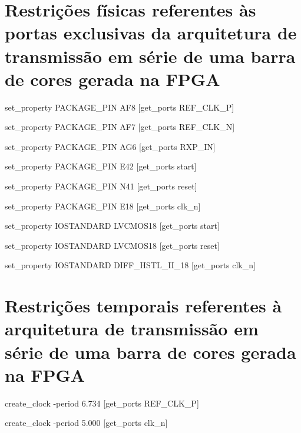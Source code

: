%

\section{Restrições físicas referentes às portas exclusivas da arquitetura de transmissão em série de uma barra de cores gerada na FPGA} \label{ap:fisicas_planD}

set\_property PACKAGE\_PIN AF8 [get\_ports REF\_CLK\_P]

set\_property PACKAGE\_PIN AF7 [get\_ports REF\_CLK\_N]

set\_property PACKAGE\_PIN AG6 [get\_ports RXP\_IN]

set\_property PACKAGE\_PIN E42 [get\_ports start]

set\_property PACKAGE\_PIN N41 [get\_ports reset]

set\_property PACKAGE\_PIN E18 [get\_ports clk\_n]

set\_property IOSTANDARD LVCMOS18 [get\_ports start]

set\_property IOSTANDARD LVCMOS18 [get\_ports reset]

set\_property IOSTANDARD DIFF\_HSTL\_II\_18 [get\_ports clk\_n]

\section{Restrições temporais referentes à arquitetura de transmissão em série de uma barra de cores gerada na FPGA} \label{ap:temporais_planD}

create\_clock -period 6.734 [get\_ports REF\_CLK\_P]

create\_clock -period 5.000 [get\_ports clk\_n]

